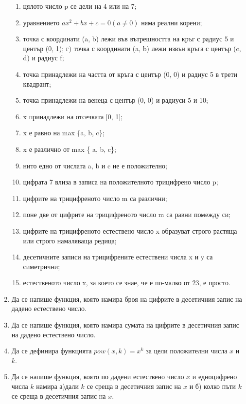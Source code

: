 \begin{enumerate}[]
	\begin{enumerate}[label=\alph*)]%
			 \item цялото число p се дели на 4 или на 7;
			 \item уравнението $ax^2 + bx + c = 0 (a \neq 0)$ няма реални корени;
			 \item точка с координати (a, b) лежи във вътрешността на кръг с радиус 5 и център (0, 1); г) точка с координати (a, b) лежи извън кръга с център (c, d) и радиус f;
			 \item точка принадлежи на частта от кръга с център (0, 0) и радиус 5 в трети квадрант;
			 \item точка принадлежи на венеца с център (0, 0) и радиуси 5 и 10;
			 \item x принадлежи на отсечката [0, 1];
			 \item x е равно на max \{a, b, c\};
			 \item x е различно от max \{ a, b, c\};
			 \item нито едно от числата a, b и c не е положително;
			 \item цифрата 7 влиза в записа на положителното трицифрено число p;
			 \item цифрите на трицифреното число m са различни;
			 \item поне две от цифрите на трицифреното число m са равни помежду си;
			 \item цифрите на трицифреното естествено число x образуват строго растяща или строго намаляваща редица;
			 \item десетичните записи на трицифрените естествени числа x и y са симетрични;
			 \item естественото число x, за което се знае, че е по-малко от 23, е просто.
  \end{enumerate}

  \item Да се напише функция, която намира броя на цифрите в десетичния запис на дадено естествено число.
  
  \item Да се напише функция, която намира сумата на цифрите в десетичния запис на дадено естествено число.
  
  \item Да се дефинира функцията $pow(x,k)=x^k$ за цели положителни числа $x$ и $k$.
  
  \item Да се напише функция, която по дадени естествено число $x$ и едноцифрено числа $k$ намира а)дали $k$ се среща в десетичния запис на $x$ и б) колко пъти $k$ се среща в десетичния запис на $x$.
  

\end{enumerate}
